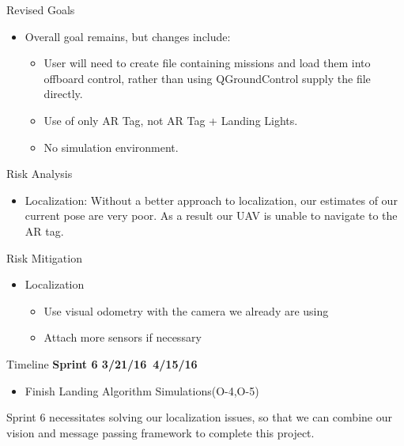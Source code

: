 \documentclass[11pt]{beamer}
\begin{document}
\begin{frame}{Revised Goals}
	\begin{itemize}
		\item Overall goal remains, but changes include:
		\begin{itemize}
		\item User will need to create file containing missions and load them into offboard control, rather than using QGroundControl supply the file directly.
		\item Use of only AR Tag, not AR Tag + Landing Lights.
		\item No simulation environment.
		
		\end{itemize}
	\end{itemize}

\end{frame}



\begin{frame}{Risk Analysis}
\begin{itemize}
\item Localization: Without a better approach to localization, our estimates of our current pose are very poor. As a result our UAV is unable to navigate to the AR tag.
\end{itemize}


\end{frame}

\begin{frame}{Risk Mitigation}
\begin{itemize}
\item Localization
\begin{itemize}
\item Use visual odometry with the camera we already are using
\item Attach more sensors if necessary
\end{itemize}

\end{itemize}

\end{frame}


\begin{frame}{Timeline}
\textbf{Sprint 6 3/21/16~4/15/16}
\begin{itemize}
\item Finish Landing Algorithm Simulations(O-4,O-5)
\end{itemize}
\vspace{2mm}
Sprint 6 necessitates solving our localization issues, so that we can combine our vision and message passing framework to complete this project.
\end{frame}
\end{document}
